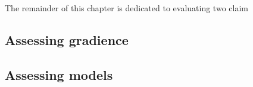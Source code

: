 
The remainder of this chapter is dedicated to evaluating two claim

\subsection{Assessing gradience} 
\subsection{Assessing models}    
